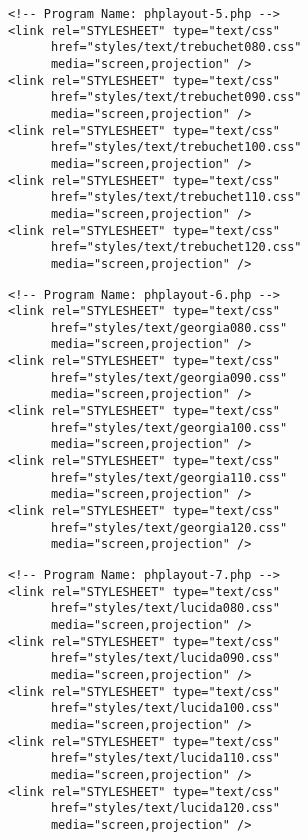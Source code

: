 \documentclass[12pt,a4paper,twosides,ngerman]{scrbook}
\begin{document}
\begin{center}
\begin{minipage}[t]{155mm}
\begin{lstlisting}[captionpos=b, caption=Layout - phplayout-5.php]
<!-- Program Name: phplayout-5.php -->
<link rel="STYLESHEET" type="text/css"
      href="styles/text/trebuchet080.css"
      media="screen,projection" />
<link rel="STYLESHEET" type="text/css"
      href="styles/text/trebuchet090.css"
      media="screen,projection" />
<link rel="STYLESHEET" type="text/css"
      href="styles/text/trebuchet100.css"
      media="screen,projection" />
<link rel="STYLESHEET" type="text/css"
      href="styles/text/trebuchet110.css"
      media="screen,projection" />
<link rel="STYLESHEET" type="text/css"
      href="styles/text/trebuchet120.css"
      media="screen,projection" />
\end{lstlisting}
\end{minipage}
\end{center} 

\begin{center}
\begin{minipage}[t]{155mm}
\begin{lstlisting}[captionpos=b, caption=Layout - phplayout-6.php]
<!-- Program Name: phplayout-6.php -->
<link rel="STYLESHEET" type="text/css"
      href="styles/text/georgia080.css"
      media="screen,projection" />
<link rel="STYLESHEET" type="text/css"
      href="styles/text/georgia090.css"
      media="screen,projection" />
<link rel="STYLESHEET" type="text/css"
      href="styles/text/georgia100.css"
      media="screen,projection" />
<link rel="STYLESHEET" type="text/css"
      href="styles/text/georgia110.css"
      media="screen,projection" />
<link rel="STYLESHEET" type="text/css"
      href="styles/text/georgia120.css"
      media="screen,projection" />
\end{lstlisting}
\end{minipage}
\end{center} 
 
\begin{center}
\begin{minipage}[t]{155mm}
\begin{lstlisting}[captionpos=b, caption=Layout - phplayout-7.php]
<!-- Program Name: phplayout-7.php -->
<link rel="STYLESHEET" type="text/css"
      href="styles/text/lucida080.css"
      media="screen,projection" />
<link rel="STYLESHEET" type="text/css"
      href="styles/text/lucida090.css"
      media="screen,projection" />
<link rel="STYLESHEET" type="text/css"
      href="styles/text/lucida100.css"
      media="screen,projection" />
<link rel="STYLESHEET" type="text/css"
      href="styles/text/lucida110.css"
      media="screen,projection" />
<link rel="STYLESHEET" type="text/css"
      href="styles/text/lucida120.css"
      media="screen,projection" />
\end{lstlisting}
\end{minipage}
\end{center} 
 
\end{document}
